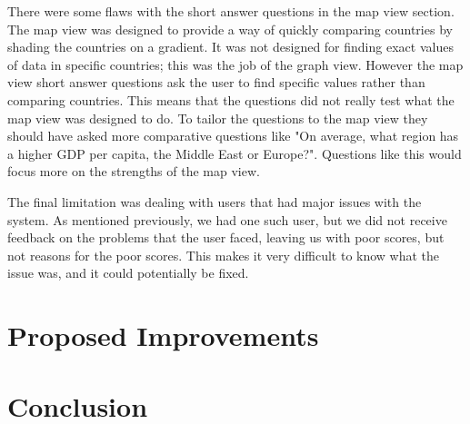 \documentclass[10pt, journal]{IEEEtran}
\begin{document}
There were some flaws with the short answer questions in the map view section. The map view was designed to provide a way of quickly comparing countries by shading the countries on a gradient. It was not designed for finding exact values of data in specific countries; this was the job of the graph view. However the map view short answer questions ask the user to find specific values rather than comparing countries. This means that the questions did not really test what the map view was designed to do. To tailor the questions to the map view they should have asked more comparative questions like "On average, what region has a higher GDP per capita, the Middle East or Europe?". Questions like this would focus more on the strengths of the map view. 

The final limitation was dealing with users that had major issues with the system. As mentioned previously, we had one such user, but we did not receive feedback on the problems that the user faced, leaving us with poor scores, but not reasons for the poor scores. This makes it very difficult to know what the issue was, and it could potentially be fixed.

\section{Proposed Improvements}

\section{Conclusion}


\nocite{*}



\end{document}
